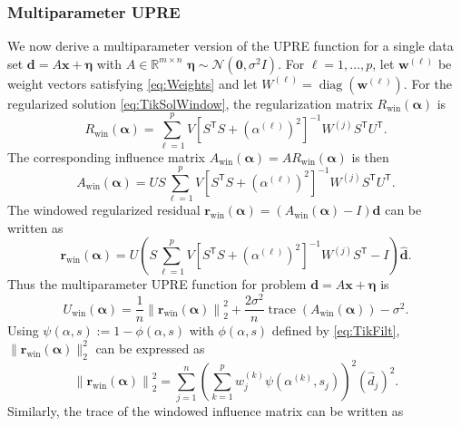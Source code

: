 \documentclass[12pt]{article}
\newcommand{\dVec}{\mathbf{d}}	%
\newcommand{\rVec}{\mathbf{r}}	%
\newcommand{\xVec}{\mathbf{x}}	%
\newcommand{\wVec}{\mathbf{w}}	%
\newcommand{\trans}[1]{{#1}^\mathsf{T}}	%
\newcommand{\inv}[1]{{#1}^{-1}}	%
\DeclareMathOperator{\trace}{trace}		%
\DeclareMathOperator{\diag}{diag}	%
\newcommand{\dft}[1]{\widehat{#1}}	%
\newcommand{\regparam}{\alpha}  %
\newcommand{\regparamVec}{\mathbf{\regparam}}   %
\newcommand{\filt}{\phi}
\newcommand{\mfilt}{\psi}
\newcommand{\noise}{\eta}	%
\newcommand{\noiseSD}{\sigma}	%
\newcommand{\noiseVec}{\bm{\noise}}	%
\newcommand{\zeroVec}{\bm{0}}	%
\newcommand{\singular}{s}	%
\begin{document}
\subsubsection{Multiparameter UPRE}
We now derive a multiparameter version of the UPRE function for a single data set $\dVec = A\xVec + \noiseVec$ with $A \in \mathbb{R}^{m \times n}$ $\noiseVec \sim \mathcal{N}(\zeroVec,\noiseSD^2 I)$. For $\ell = 1,\ldots,p$, let $\wVec^{(\ell)}$ be weight vectors satisfying \eqref{eq:Weights} and let $W^{(\ell)} = \diag(\wVec^{(\ell)})$. For the regularized solution \eqref{eq:TikSolWindow}, the regularization matrix $R_\text{win}(\regparamVec)$ is
\begin{equation}
\label{eq:Windowed Reg Matrix}
    R_\text{win}(\regparamVec) = \sum_{\ell=1}^p V\inv{\left[\trans{S}S + (\regparam^{(\ell)})^2\right]}W^{(j)}\trans{S}\trans{U}.
\end{equation}
The corresponding influence matrix $A_\text{win}(\regparamVec) = AR_\text{win}(\regparamVec)$ is then
\begin{equation}
\label{eq:Windowed Influence Matrix}
    A_\text{win}(\regparamVec) = US\sum_{\ell=1}^p V\inv{\left[\trans{S}S + (\regparam^{(\ell)})^2\right]}W^{(j)}\trans{S}\trans{U}. 
\end{equation}
The windowed regularized residual $\rVec_\text{win}(\regparamVec) = (A_\text{win}(\regparamVec) - I)\dVec$ can be written as
\begin{equation}
    \rVec_\text{win}(\regparamVec) = U\left(S\sum_{\ell=1}^p V\inv{\left[\trans{S}S + (\regparam^{(\ell)})^2\right]}W^{(j)}\trans{S}-I\right)\dft{\dVec}.
\end{equation}
Thus the multiparameter UPRE function for problem $\dVec = A\xVec + \noiseVec$ is 
\begin{equation}
\label{eq:Multiparameter UPRE}
    U_\text{win}(\regparamVec) = \frac{1}{n}\left\|\rVec_\text{win}(\regparamVec)\right\|_2^2 + \frac{2\noiseSD^2}{n}\trace\left(A_\text{win}(\regparamVec)\right) - \noiseSD^2.
\end{equation}
Using $\mfilt(\regparam,\singular) := 1 - \filt(\regparam,\singular)$ with $\filt(\regparam,\singular)$ defined by \eqref{eq:TikFilt}, $\|\rVec_\text{win}(\regparamVec)\|_2^2$ can be expressed as
\begin{equation}
    \left\|\rVec_\text{win}(\regparamVec)\right\|_2^2 = \sum_{j=1}^{n} \left(\sum_{k=1}^{p} w_j^{(k)} \mfilt\left(\regparam^{(k)},\singular_j\right) \right)^2 \left(\dft{d}_j\right)^2.
\end{equation}
Similarly, the trace of the windowed influence matrix can be written as
\end{document}
